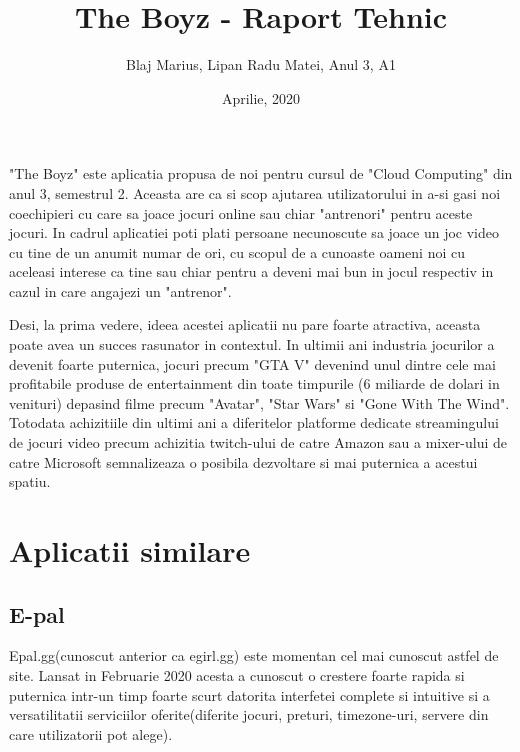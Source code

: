 \documentclass{article}
\title{The Boyz - Raport Tehnic}
\date{Aprilie, 2020}
\author{ Blaj Marius, Lipan Radu Matei, Anul 3, A1}
\begin{document}
\maketitle

"The Boyz" este aplicatia propusa de noi pentru cursul de "Cloud Computing" din anul 3, semestrul 2. Aceasta are ca si scop ajutarea utilizatorului in a-si gasi noi coechipieri cu care sa joace jocuri online sau chiar "antrenori" pentru aceste jocuri. In cadrul aplicatiei poti plati persoane necunoscute sa joace un joc video cu tine de un anumit numar de ori, cu scopul de a cunoaste oameni noi cu aceleasi interese ca tine sau chiar pentru a deveni mai bun in jocul respectiv in cazul in care angajezi un "antrenor".

Desi, la prima vedere, ideea acestei aplicatii nu pare foarte atractiva, aceasta poate avea un succes rasunator in contextul. In ultimii ani industria jocurilor a devenit foarte puternica, jocuri precum "GTA V" devenind unul dintre cele mai profitabile produse de entertainment din toate timpurile (6 miliarde de dolari in venituri) depasind filme precum "Avatar", "Star Wars" si "Gone With The Wind"\cite{gameindustry}. Totodata achizitiile din ultimi ani a diferitelor platforme dedicate streamingului de jocuri video precum achizitia twitch-ului de catre Amazon sau a mixer-ului de catre Microsoft semnalizeaza o posibila dezvoltare si mai puternica a acestui spatiu.

\section{Aplicatii similare}
\subsection{E-pal}
Epal.gg\cite{epal}(cunoscut anterior ca egirl.gg) este momentan cel mai cunoscut astfel de site. Lansat in Februarie 2020 acesta a cunoscut o crestere foarte rapida si puternica intr-un timp foarte scurt datorita interfetei complete si intuitive si a versatilitatii serviciilor oferite(diferite jocuri, preturi, timezone-uri, servere din care utilizatorii pot alege).
\end{document}
